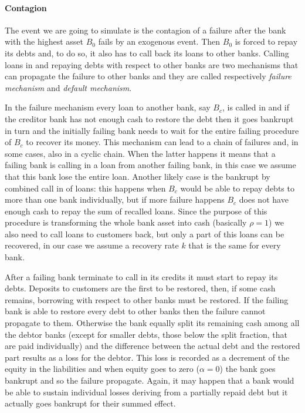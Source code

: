 \documentclass[a4paper, 11pt]{article}
\begin{document}
\paragraph{Contagion} %
The event we are going to simulate is the contagion of a failure after the bank with the highest asset $B_0$ fails by an exogenous event. Then $B_0$ is forced to repay its debts and, to do so, it also has to call back its loans to other banks. Calling loans in and repaying debts with respect to other banks are two mechanisms that can propagate the failure to other banks and they are called respectively \emph{failure mechanism} and \emph{default mechanism}.

In the failure mechanism every loan to another bank, say $B_c$, is called in and if the creditor bank has not enough cash to restore the debt then it goes bankrupt in turn and the initially failing bank needs to wait for the entire failing procedure of $B_c$ to recover its money. This mechanism can lead to a chain of failures and, in some cases, also in a cyclic chain. When the latter happens it means that a failing bank is calling in a loan from another failing bank, in this case we assume that this bank lose the entire loan. Another likely case is the bankrupt by combined call in of loans: this happens when $B_c$ would be able to repay debts to more than one bank individually, but if more failure happens $B_c$ does not have enough cash to repay the sum of recalled loans. Since the purpose of this procedure is transforming the whole bank asset into cash (basically $\rho = 1$) we also need to call loans to customers back, but only a part of this loans can be recovered, in our case we assume a recovery rate $k$ that is the same for every bank.

After a failing bank terminate to call in its credits it must start to repay its debts. Deposits to customers are the first to be restored, then, if some cash remains, borrowing with respect to other banks must be restored. If the failing bank is able to restore every debt to other banks then the failure cannot propagate to them. Otherwise the bank equally split its remaining cash among all the debtor banks (except for smaller debts, those below the split fraction, that are paid individually) and the difference between the actual debt and the restored part results as a loss for the debtor. This loss is recorded as a decrement of the equity in the liabilities and when equity goes to zero ($\alpha = 0$) the bank goes bankrupt and so the failure propagate. Again, it may happen that a bank would be able to sustain individual losses deriving from a partially repaid debt but it actually goes bankrupt for their summed effect.
\end{document}

